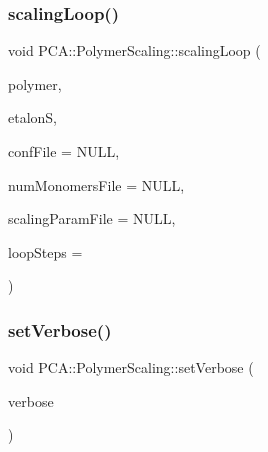 \hypertarget{class_p_c_a_1_1_polymer_scaling_a5286d41c8e899e596526fb936a5e2a9b}{}\label{class_p_c_a_1_1_polymer_scaling_a5286d41c8e899e596526fb936a5e2a9b} 
\subsubsection{\texorpdfstring{scaling\+Loop()}{scalingLoop()}}
{\footnotesize\ttfamily void P\+C\+A\+::\+Polymer\+Scaling\+::scaling\+Loop (\begin{DoxyParamCaption}\item[{\hyperlink{class_p_c_a_1_1_polymer}{Polymer} $\ast$$\ast$}]{polymer,  }\item[{const \hyperlink{class_p_c_a_1_1_polymer_scaling_1_1_scaling_param}{Scaling\+Param} \&}]{etalonS,  }\item[{F\+I\+LE $\ast$}]{conf\+File = {\ttfamily NULL},  }\item[{F\+I\+LE $\ast$}]{num\+Monomers\+File = {\ttfamily NULL},  }\item[{F\+I\+LE $\ast$}]{scaling\+Param\+File = {\ttfamily NULL},  }\item[{int}]{loop\+Steps = {} }\end{DoxyParamCaption})\hspace{0.3cm}{\ttfamily [static]}}

\hypertarget{class_p_c_a_1_1_polymer_scaling_a02f133a0bfdf54a7677c8f9637a4238a}{}\label{class_p_c_a_1_1_polymer_scaling_a02f133a0bfdf54a7677c8f9637a4238a} 
\subsubsection{\texorpdfstring{set\+Verbose()}{setVerbose()}}
{\footnotesize\ttfamily void P\+C\+A\+::\+Polymer\+Scaling\+::set\+Verbose (\begin{DoxyParamCaption}\item[{double}]{verbose }\end{DoxyParamCaption})\hspace{0.3cm}{\ttfamily [static]}}

\hypertarget{class_p_c_a_1_1_polymer_scaling_a5e0684790a3295de961dcc7b282c8c1f}{}\label{class_p_c_a_1_1_polymer_scaling_a5e0684790a3295de961dcc7b282c8c1f} 
